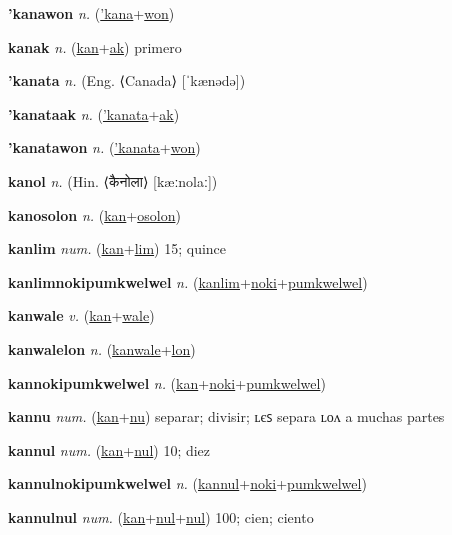 \textbf{\hypertarget{'kanawon}{'kanawon}} \textit{n.} (\hyperlink{'kana}{'kana}+\allowbreak \hyperlink{won}{won})


\textbf{\hypertarget{kanak}{kanak}} \textit{n.} (\hyperlink{kan}{kan}+\allowbreak \hyperlink{ak}{ak})
primero

\textbf{\hypertarget{'kanata}{'kanata}} \textit{n.} (Eng. ⟨Canada⟩ [ˈkænədə])


\textbf{\hypertarget{'kanataak}{'kanataak}} \textit{n.} (\hyperlink{'kanata}{'kanata}+\allowbreak \hyperlink{ak}{ak})


\textbf{\hypertarget{'kanatawon}{'kanatawon}} \textit{n.} (\hyperlink{'kanata}{'kanata}+\allowbreak \hyperlink{won}{won})


\textbf{\hypertarget{kanol}{kanol}} \textit{n.} (Hin. ⟨{\devanagari{}कैनोला}⟩ [kæːnolaː])


\textbf{\hypertarget{kanosolon}{kanosolon}} \textit{n.} (\hyperlink{kan}{kan}+\allowbreak \hyperlink{osolon}{osolon})


\textbf{\hypertarget{kanlim}{kanlim}} \textit{num.} (\hyperlink{kan}{kan}+\allowbreak \hyperlink{lim}{lim})
15; quince

\textbf{\hypertarget{kanlimnokipumkwelwel}{kanlimnokipumkwelwel}} \textit{n.} (\hyperlink{kanlim}{kanlim}+\allowbreak \hyperlink{noki}{noki}+\allowbreak \hyperlink{pumkwelwel}{pumkwelwel})


\textbf{\hypertarget{kanwale}{kanwale}} \textit{v.} (\hyperlink{kan}{kan}+\allowbreak \hyperlink{wale}{wale})


\textbf{\hypertarget{kanwalelon}{kanwalelon}} \textit{n.} (\hyperlink{kanwale}{kanwale}+\allowbreak \hyperlink{lon}{lon})


\textbf{\hypertarget{kannokipumkwelwel}{kannokipumkwelwel}} \textit{n.} (\hyperlink{kan}{kan}+\allowbreak \hyperlink{noki}{noki}+\allowbreak \hyperlink{pumkwelwel}{pumkwelwel})


\textbf{\hypertarget{kannu}{kannu}} \textit{num.} (\hyperlink{kan}{kan}+\allowbreak \hyperlink{nu}{nu})
separar; divisir; ʟєꜱ separa ʟᴏᴧ a muchas partes

\textbf{\hypertarget{kannul}{kannul}} \textit{num.} (\hyperlink{kan}{kan}+\allowbreak \hyperlink{nul}{nul})
10; diez

\textbf{\hypertarget{kannulnokipumkwelwel}{kannulnokipumkwelwel}} \textit{n.} (\hyperlink{kannul}{kannul}+\allowbreak \hyperlink{noki}{noki}+\allowbreak \hyperlink{pumkwelwel}{pumkwelwel})


\textbf{\hypertarget{kannulnul}{kannulnul}} \textit{num.} (\hyperlink{kan}{kan}+\allowbreak \hyperlink{nul}{nul}+\allowbreak \hyperlink{nul}{nul})
100; cien; ciento

